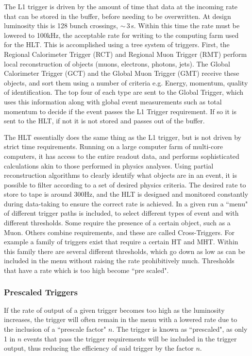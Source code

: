 The L1 trigger is driven by the amount of time that data at the incoming rate that can be stored in the buffer, before needing to be overwritten. At design luminosity this is 128 bunch crossings, $\sim$\,3\,\textmu s. Within this time the rate must be lowered to 100kHz, the acceptable rate for writing to the computing farm used for the HLT. This is accomplished using a tree system of triggers. First, the Regional Calorimeter Trigger (RCT) and Regional Muon Trigger (RMT) perform local reconstruction of objects (muons, electrons, photons, jets). The Global Calorimeter Trigger (GCT) and the Global Muon Trigger (GMT) receive these objects, and sort them using a number of criteria e.g. Energy, momentum, quality of identification. The top four of each type are sent to the Global Trigger, which uses this information along with global event measurements such as total momentum to decide if the event passes the L1 Trigger requirement. If so it is sent to the HLT, if not it is not stored and passes out of the buffer. 

The HLT essentially does the same thing as the L1 trigger, but is not driven by strict time requirements. Running on a large computer farm of multi-core computers, it has access to the entire readout data, and performs sophisticated calculations akin to those performed in physics analyses. Using partial reconstruction algorithms to clearly identify what objects are in an event, it is possible to filter according to a set of desired physics criteria.  The desired rate to store to tape is around 300Hz, and the HLT is designed and monitored constantly during data-taking to ensure the correct rate is achieved. In a given run a ``menu" of different trigger paths is included, to select different types of event and with different thresholds. Some require the presence of a certain object, such as a Muon. Others combine requirements, and these are called Cross-Triggers. For example a family of triggers exist that require a certain HT and MHT. Within this family there are several different thresholds, which go down as low as can be included in the menu without raising the rate prohibitively much. Thresholds that have a rate which is too high become ``pre scaled".
\subsubsection{Prescaled Triggers}
If the rate of output of a given trigger becomes too high as the luminosity increases, the trigger will often remain in the menu with a lowered rate due to the inclusion of a ``prescale factor" $n$. The trigger is known as ``prescaled", as only 1 in $n$ events that pass the trigger requirements will be included in the trigger output, thus reducing the efficiency of said trigger by the factor $n$. 

